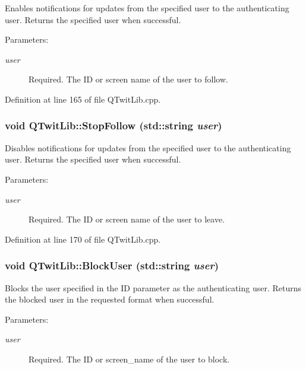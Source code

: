 Enables notifications for updates from the specified user to the authenticating user. Returns the specified user when successful. \begin{Desc}
\item[Parameters:]
\begin{description}
\item[{\em user}]Required. The ID or screen name of the user to follow. \end{description}
\end{Desc}


Definition at line 165 of file QTwitLib.cpp.\hypertarget{classQTwitLib_8f1cf32162899f244c32e5aa80efa03c}{
\subsubsection{\setlength{\rightskip}{0pt plus 5cm}void QTwitLib::StopFollow (std::string {\em user})}}
\label{classQTwitLib_8f1cf32162899f244c32e5aa80efa03c}


Disables notifications for updates from the specified user to the authenticating user. Returns the specified user when successful. \begin{Desc}
\item[Parameters:]
\begin{description}
\item[{\em user}]Required. The ID or screen name of the user to leave. \end{description}
\end{Desc}


Definition at line 170 of file QTwitLib.cpp.\hypertarget{classQTwitLib_1d58c50e49ec6fc89d64ed3118643a16}{
\subsubsection{\setlength{\rightskip}{0pt plus 5cm}void QTwitLib::BlockUser (std::string {\em user})}}
\label{classQTwitLib_1d58c50e49ec6fc89d64ed3118643a16}


Blocks the user specified in the ID parameter as the authenticating user. Returns the blocked user in the requested format when successful. \begin{Desc}
\item[Parameters:]
\begin{description}
\item[{\em user}]Required. The ID or screen\_\-name of the user to block. \end{description}
\end{Desc}


